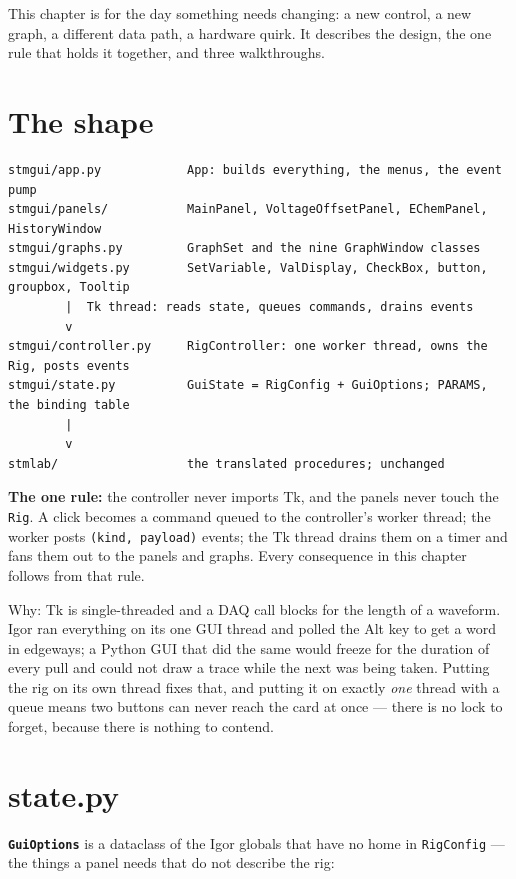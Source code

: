 This chapter is for the day something needs changing: a new control, a new graph, a different data path, a hardware quirk. It describes the design, the one rule that holds it together, and three walkthroughs.

\section{The shape}

\begin{lstlisting}[style=out]
stmgui/app.py            App: builds everything, the menus, the event pump
stmgui/panels/           MainPanel, VoltageOffsetPanel, EChemPanel, HistoryWindow
stmgui/graphs.py         GraphSet and the nine GraphWindow classes
stmgui/widgets.py        SetVariable, ValDisplay, CheckBox, button, groupbox, Tooltip
        |  Tk thread: reads state, queues commands, drains events
        v
stmgui/controller.py     RigController: one worker thread, owns the Rig, posts events
stmgui/state.py          GuiState = RigConfig + GuiOptions; PARAMS, the binding table
        |
        v
stmlab/                  the translated procedures; unchanged
\end{lstlisting}

\textbf{The one rule:} the controller never imports Tk, and the panels never touch the \texttt{Rig}. A click becomes a command queued to the controller's worker thread; the worker posts \texttt{(kind,\discretionary{}{}{} payload)} events; the Tk thread drains them on a timer and fans them out to the panels and graphs. Every consequence in this chapter follows from that rule.

Why: Tk is single-threaded and a DAQ call blocks for the length of a waveform. Igor ran everything on its one GUI thread and polled the Alt key to get a word in edgeways; a Python GUI that did the same would freeze for the duration of every pull and could not draw a trace while the next was being taken. Putting the rig on its own thread fixes that, and putting it on exactly \emph{one} thread with a queue means two buttons can never reach the card at once --- there is no lock to forget, because there is nothing to contend.

\section{state.py}

\textbf{\texttt{Gui\discretionary{}{}{}Options}} is a dataclass of the Igor globals that have no home in \texttt{Rig\discretionary{}{}{}Config} --- the things a panel needs that do not describe the rig:

